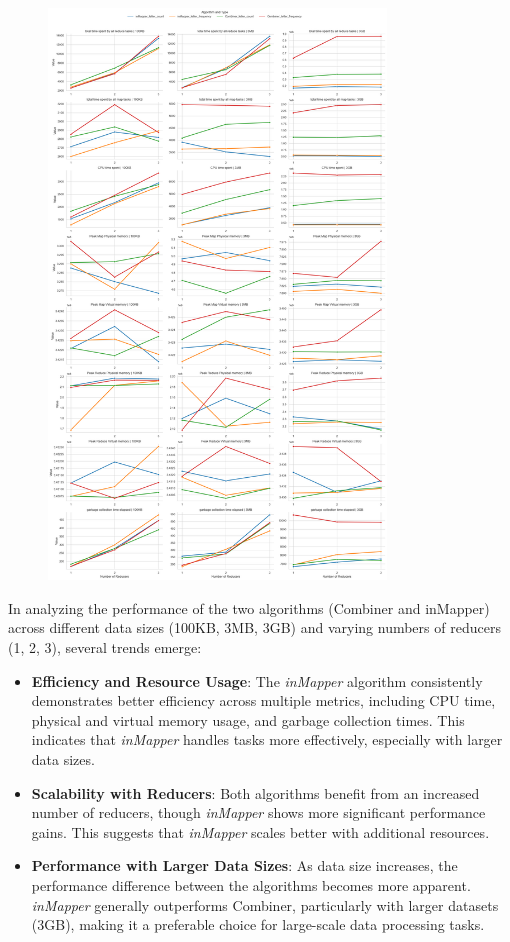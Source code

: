 \begin{figure}[h!]
    \centering
    \includegraphics[width=0.8\textwidth]{media/performance.png}
\end{figure}

In analyzing the performance of the two algorithms (Combiner and inMapper) across different data sizes (100KB, 3MB, 3GB) and varying numbers of reducers (1, 2, 3), several trends emerge:

\begin{itemize}
    \item \textbf{Efficiency and Resource Usage}: The \textit{inMapper} algorithm consistently demonstrates better efficiency across multiple metrics, including CPU time, physical and virtual memory usage, and garbage collection times. This indicates that \textit{inMapper} handles tasks more effectively, especially with larger data sizes.
    \item \textbf{Scalability with Reducers}: Both algorithms benefit from an increased number of reducers, though \textit{inMapper} shows more significant performance gains. This suggests that \textit{inMapper} scales better with additional resources.
    \item \textbf{Performance with Larger Data Sizes}: As data size increases, the performance difference between the algorithms becomes more apparent. \textit{inMapper} generally outperforms Combiner, particularly with larger datasets (3GB), making it a preferable choice for large-scale data processing tasks.
\end{itemize}

